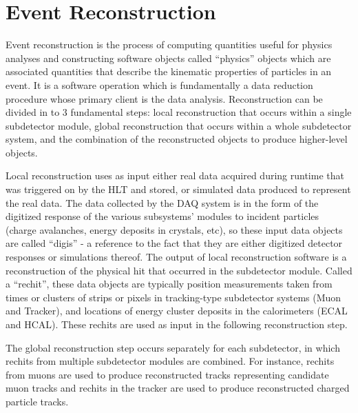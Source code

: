 \chapter{Event Reconstruction} %
\label{reco} 



Event reconstruction is the process of computing quantities useful for physics analyses and constructing software objects called ``physics'' objects which are associated quantities that describe the kinematic properties of particles in an event.  It is a software operation which is fundamentally a data reduction procedure whose primary client is the data analysis.  Reconstruction can be divided in to 3 fundamental steps: local reconstruction that occurs within a single subdetector module, global reconstruction that occurs within a whole subdetector system, and the combination of the reconstructed objects to produce higher-level objects.  

Local reconstruction uses as input either real data acquired during runtime that was triggered on by the HLT and stored, or simulated data produced to represent the real data.  The data collected by the DAQ system is in the form of the digitized response of the various subsystems' modules to incident particles (charge avalanches, energy deposits in crystals, etc), so these input data objects are called ``digis'' - a reference to the fact that they are either digitized detector responses or simulations thereof.  The output of local reconstruction software is a reconstruction of the physical hit that occurred in the subdetector module.  Called a ``rechit'', these data objects are typically position measurements taken from times or clusters of strips or pixels in tracking-type subdetector systems (Muon and Tracker), and locations of energy cluster deposits in the calorimeters (ECAL and HCAL).  These rechits are used as input in the following reconstruction step.  

The global reconstruction step occurs separately for each subdetector, in which rechits from multiple subdetector modules are combined.  For instance, rechits from muons are used to produce reconstructed tracks representing candidate muon tracks and rechits in the tracker are used to produce reconstructed charged particle tracks.

